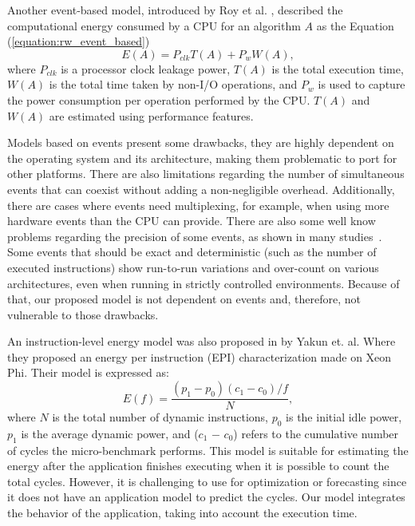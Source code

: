 Another event-based model, introduced by Roy et al. \cite{Roy2013AnAlgorithms}, described the computational energy consumed by a CPU for an algorithm $A$ as the Equation (\ref{equation:rw_event_based})%
\begin{equation}
	E(A) = P_{clk}T(A) + P_wW(A),
	\label{equation:rw_event_based}
\end{equation}
where $P_{clk}$ is a processor clock leakage power, $T(A)$ is the total execution time, $W(A)$ is the total time taken by  non-I/O operations, and $P_w$ is used to capture the power consumption per operation performed by the CPU. $T(A)$ and $W(A)$ are estimated using performance features.

Models based on events present some drawbacks, they are highly dependent on the operating system and its architecture, making them problematic to port for other platforms. There are also limitations regarding the number of simultaneous events that can coexist without adding a non-negligible overhead. Additionally, there are cases where events need multiplexing, for example, when using more hardware events than %
the CPU can provide. There are also some well know problems regarding the precision of some events, as shown in many studies~\cite{Weaver2008CanTrusted, Weaver2013Non-determinismImplementations, Das2019SoK:Security, McGuire2009AnalysisKernel, Ramos2019AnCounters, Silva-de-Souza2020ContainergyAWorkloads}. Some events that should be exact and deterministic (such as the number of executed instructions) show run-to-run variations and over-count on various architectures, even when running in strictly controlled environments. Because of that, our proposed model is not dependent on events and, therefore, not vulnerable to those drawbacks.

An instruction-level energy model was also proposed in \cite{Shao2013EnergyProcessor} by Yakun et. al. Where they proposed an energy per instruction (EPI) characterization made on Xeon Phi. Their model is expressed as:
\begin{equation}
	E(f) = \frac{(p_1 - p_0)(c_1 - c_0)/f}{N}, 
	\label{eq:rw_instruction_level}
\end{equation}
where $N$ is the total number of dynamic instructions, $p_0$ is the initial idle power, $p_1$ is the average dynamic power, and ($c_1$ $-$ $c_0$) refers to the cumulative number of cycles the micro-benchmark performs. This model is suitable for estimating the energy after the application finishes executing when it is possible to count the total cycles. However, it is challenging to use for optimization or forecasting since it does not have an application model to predict the cycles. Our model integrates the behavior of the application, taking into account the execution time.


